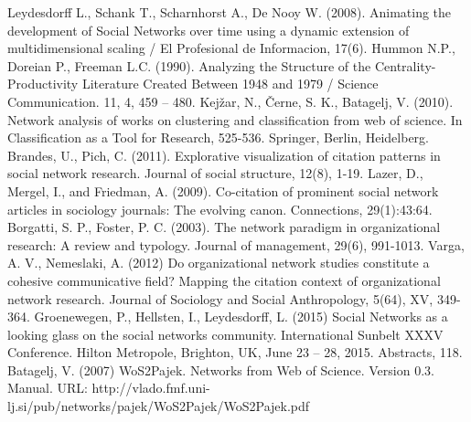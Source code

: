 \documentclass[11pt]{article} %
\begin{document}
\begin{thebibliography}{99}
   Leydesdorff L., Schank T., Scharnhorst A., De Nooy W. (2008). Animating the development of Social Networks over time using a dynamic extension of multidimensional scaling / El Profesional de Informacion, 17(6).
   Hummon N.P., Doreian P., Freeman L.C. (1990). Analyzing the Structure of the Centrality-Productivity Literature Created Between 1948 and 1979 / Science Communication. 11, 4, 459 – 480. 
Kejžar, N., Černe, S. K., Batagelj, V. (2010). Network analysis of works on clustering and classification from web of science. In Classification as a Tool for Research, 525-536. Springer, Berlin, Heidelberg.
Brandes, U., Pich, C. (2011). Explorative visualization of citation patterns in social network research. Journal of social structure, 12(8), 1-19.
Lazer, D., Mergel, I., and Friedman, A. (2009). Co-citation of prominent social network articles in sociology journals: The evolving canon. Connections, 29(1):43:64. 
Borgatti, S. P., Foster, P. C. (2003). The network paradigm in organizational research: A review and typology. Journal of management, 29(6), 991-1013.
Varga, A. V., Nemeslaki, A. (2012) Do organizational network studies constitute a cohesive communicative field? Mapping the citation context of organizational network research. Journal of Sociology and Social Anthropology, 5(64), XV, 349-364. 
Groenewegen, P., Hellsten, I., Leydesdorff, L. (2015) Social Networks as a looking glass on the social networks community. International Sunbelt XXXV Conference. Hilton Metropole, Brighton, UK, June 23 – 28, 2015. Abstracts, 118. 
Batagelj, V. (2007) WoS2Pajek. Networks from Web of Science. Version 0.3. Manual. URL: http://vlado.fmf.uni-lj.si/pub/networks/pajek/WoS2Pajek/WoS2Pajek.pdf
\end{thebibliography}   

\appendix
\end{document}
